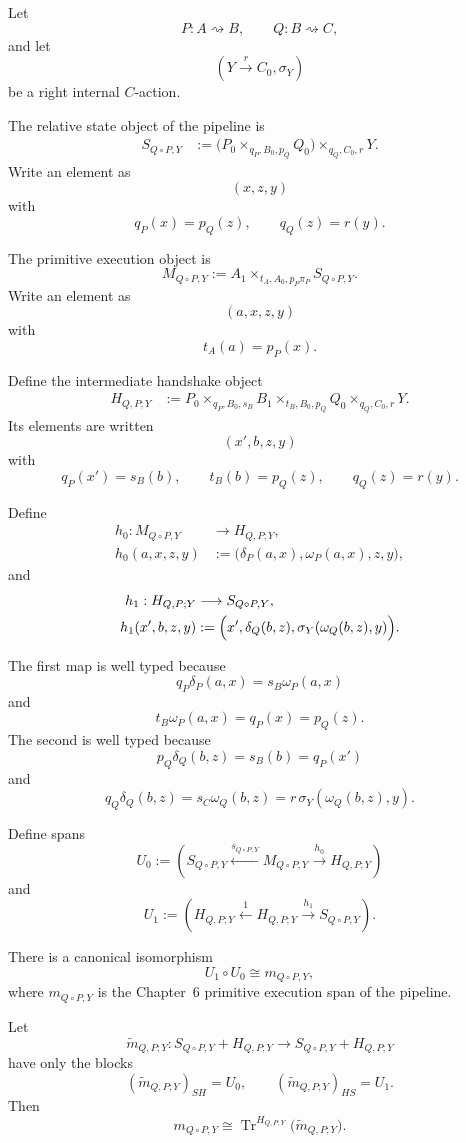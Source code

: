 Let
\[
  P:A\rightsquigarrow B,
  \qquad
  Q:B\rightsquigarrow C,
\]
and let
\[
  (Y\xrightarrow{r}C_0,\sigma_Y)
\]
be a right internal \(C\)-action.

The relative state object of the pipeline is
\[
\begin{aligned}
  S_{Q\circ P,Y}
  &:=
  \bigl(
    P_0\times_{q_P,B_0,p_Q}Q_0
  \bigr)
  \times_{q_Q,C_0,r}
  Y.
\end{aligned}
\]
Write an element as
\[
  (x,z,y)
\]
with
\[
  q_P(x)=p_Q(z),
  \qquad
  q_Q(z)=r(y).
\]

The primitive execution object is
\[
  M_{Q\circ P,Y}
  :=
  A_1
  \times_{t_A,A_0,p_P\pi_P}
  S_{Q\circ P,Y}.
\]
Write an element as
\[
  (a,x,z,y)
\]
with
\[
  t_A(a)=p_P(x).
\]

Define the intermediate handshake object
\[
\begin{aligned}
  H_{Q,P;Y}
  &:=
  P_0
  \times_{q_P,B_0,s_B}
  B_1
  \times_{t_B,B_0,p_Q}
  Q_0
  \times_{q_Q,C_0,r}
  Y.
\end{aligned}
\]
Its elements are written
\[
  (x',b,z,y)
\]
with
\[
  q_P(x')=s_B(b),
  \qquad
  t_B(b)=p_Q(z),
  \qquad
  q_Q(z)=r(y).
\]

Define
\[
\begin{aligned}
  h_0:
  M_{Q\circ P,Y}
  &\longrightarrow
  H_{Q,P;Y},
  \\
  h_0(a,x,z,y)
  &:=
  \bigl(
    \delta_P(a,x),
    \omega_P(a,x),
    z,
    y
  \bigr),
\end{aligned}
\]
and
\[
\begin{aligned}
  h_1:
  H_{Q,P;Y}
  &\longrightarrow
  S_{Q\circ P,Y},
  \\
  h_1(x',b,z,y)
  &:=
  \Bigl(
    x',
    \delta_Q(b,z),
    \sigma_Y(\omega_Q(b,z),y)
  \Bigr).
\end{aligned}
\]

The first map is well typed because
\[
  q_P\delta_P(a,x)
  =
  s_B\omega_P(a,x)
\]
and
\[
  t_B\omega_P(a,x)
  =
  q_P(x)
  =
  p_Q(z).
\]
The second is well typed because
\[
  p_Q\delta_Q(b,z)
  =
  s_B(b)
  =
  q_P(x')
\]
and
\[
  q_Q\delta_Q(b,z)
  =
  s_C\omega_Q(b,z)
  =
  r\,\sigma_Y(\omega_Q(b,z),y).
\]

Define spans
\[
  U_0
  :=
  \left(
    S_{Q\circ P,Y}
    \xleftarrow{s_{Q\circ P,Y}}
    M_{Q\circ P,Y}
    \xrightarrow{h_0}
    H_{Q,P;Y}
  \right)
\]
and
\[
  U_1
  :=
  \left(
    H_{Q,P;Y}
    \xleftarrow{1}
    H_{Q,P;Y}
    \xrightarrow{h_1}
    S_{Q\circ P,Y}
  \right).
\]

\begin{theorem}
\label{thm:pipeline-execution-factorization}
There is a canonical isomorphism
\[
  U_1\circ U_0
  \cong
  m_{Q\circ P,Y},
\]
where \(m_{Q\circ P,Y}\) is the Chapter~6 primitive execution span of the pipeline.

Let
\[
  \widetilde m_{Q,P;Y}:
  S_{Q\circ P,Y}+H_{Q,P;Y}
  \longrightarrow
  S_{Q\circ P,Y}+H_{Q,P;Y}
\]
have only the blocks
\[
  (\widetilde m_{Q,P;Y})_{SH}=U_0,
  \qquad
  (\widetilde m_{Q,P;Y})_{HS}=U_1.
\]
Then
\[
  \boxed{
  m_{Q\circ P,Y}
  \cong
  \operatorname{Tr}^{H_{Q,P;Y}}
  \bigl(
    \widetilde m_{Q,P;Y}
  \bigr).
  }
\]
\end{theorem}

